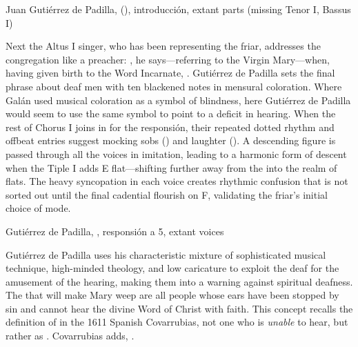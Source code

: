 
\begin{musicexample}
    \caption{Juan Gutiérrez de Padilla, 
    (), introducción, extant parts (missing Tenor I,
    Bassus I)}
    \label{mus:Padilla-Sordo-intro}
\end{musicexample}

Next the Altus I singer, who has been representing the friar, addresses the
congregation like a preacher: , he says---referring to the Virgin Mary---when, having given birth to the
Word Incarnate, .  
Gutiérrez de Padilla sets the final phrase about deaf men with ten blackened
notes in mensural coloration.
Where Galán used musical coloration as a symbol of blindness, here Gutiérrez de
Padilla would seem to use the same symbol to point to a deficit in hearing.
When the rest of Chorus I joins in for the responsión, their repeated dotted
rhythm and offbeat entries suggest mocking sobs () and laughter 
().
A descending figure is passed through all the voices in imitation, leading to
a harmonic form of descent when the Tiple I adds E flat---shifting further away
from the  into the  realm of flats.
The heavy syncopation in each voice creates rhythmic confusion that is not
sorted out until the final cadential flourish on F, validating the friar's
initial choice of mode.

\begin{musicexample}
    \caption{Gutiérrez de Padilla, ,
    responsión a 5, extant voices}
    \label{mus:Padilla-Sordo-responsion}
\end{musicexample}

Gutiérrez de Padilla uses his characteristic mixture of sophisticated musical
technique, high-minded theology, and low caricature to exploit the deaf for the
amusement of the hearing, making them into a warning against spiritual deafness.
The  that will make Mary weep are all people whose ears have
been stopped by sin and cannot hear the divine Word of Christ with faith.
This concept recalls the definition of  in the 1611 Spanish
Covarrubias, not one who is \emph{unable} to hear, but rather as .
Covarrubias adds, .%
    \Autocite
    [: .] 
    {Covarrubias:Tesoro}

